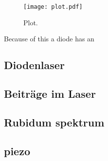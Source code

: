 \begin{figure}
  \centering
  \texttt{[image: plot.pdf]}
  \caption{Plot.}
  \label{fig:plot}
\end{figure}


Because of this a diode has an



\subsection{Diodenlaser}
\label{subsec:diodenlaser}


\subsection{Beiträge im Laser}
\label{subsec:}



\subsection{Rubidum spektrum}
\label{subsec:}


\subsection{piezo}
\label{subsec:}
